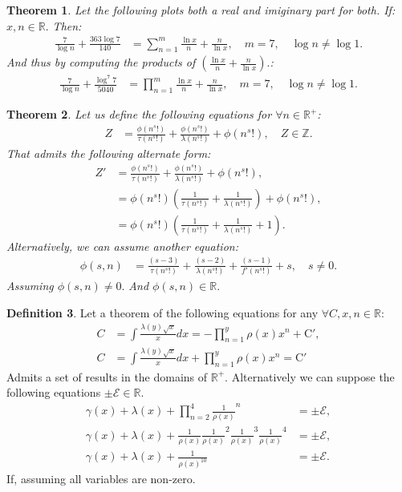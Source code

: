 \documentclass[10pt]{article}
\theoremstyle{plain}
\newtheorem{theorem}{Theorem}[section]
\theoremstyle{definition}
\newtheorem{definition}[theorem]{Definition}
\theoremstyle{remark}
\begin{document}
\begin{theorem}
	Let the following plots both a real and imiginary part for both. If: $x, n \in \mathbb{R}.$ Then:
	\begin{align*}
		\frac{7}{\log n} + \frac{363 \log 7}{140} &= \sum_{n=1}^{m} \frac{\ln x}{n} + \frac{n}{\ln x}, \quad m = 7, \quad \log n \neq \log 1.
	\end{align*}
	And thus by computing the products of $(\frac{\ln x}{n} + \frac{n}{\ln x}).$:
	\begin{align*}
		\frac{7}{\log n} + \frac{\log^{7} 7}{5040} &= \prod_{n=1}^{m} \frac{\ln x}{n} + \frac{n}{\ln x}, \quad m = 7, \quad \log n \neq \log 1.
	\end{align*}
\end{theorem}

\begin{theorem}
	Let us define the following equations for $\forall n \in \mathbb{R}^{+}$:
	\begin{align*}
		Z &= \frac{\phi(n^{s}!)}{\tau(n^{s}!)} + \frac{\phi(n^{s}!)}{\lambda(n^{s}!)} + \phi(n^{s}!), \quad Z \in \mathbb{Z}.
	\end{align*}
	That admits the following alternate form:
	\begin{align*}
		Z' &= \frac{\phi(n^{s}!)}{\tau(n^{s}!)} + \frac{\phi(n^{s}!)}{\lambda(n^{s}!)} + \phi(n^{s}!),\\
		&= \phi(n^{s}!)(\frac{1}{\tau(n^{s}!)} + \frac{1}{\lambda(n^{s}!)}) + \phi(n^{s}!),\\
		&= \phi(n^{s}!)(\frac{1}{\tau(n^{s}!)} + \frac{1}{\lambda(n^{s}!)} + 1).
	\end{align*}
	Alternatively, we can assume another equation:
	\begin{align*}
		\phi(s, n) &= \frac{(s-3)}{\tau(n^{s}!)} + \frac{(s-2)}{\lambda(n^{s}!)} + \frac{(s-1)}{f'(n^{s}!)} + s, \quad s \neq 0.
	\end{align*}
	Assuming $\phi(s, n) \neq 0.$ And $\phi(s, n) \in \mathbb{R}.$
\end{theorem}

\begin{definition}
	Let a theorem of the following equations for any $\forall C, x, n \in \mathbb{R}$:
	\begin{align*}
		C &= \int \frac{\lambda(y) \sqrt{x}}{x} dx = - \prod_{n=1}^{y}\rho(x) x^{n} + \mathrm{C}',\\
		C &= \int \frac{\lambda(y) \sqrt{x}}{x} dx + \prod_{n=1}^{y}\rho(x) x^{n} = \mathrm{C}'
	\end{align*}
	Admits a set of results in the domains of $\mathbb{R}^{+}$. Alternatively we can suppose the following equations $\pm \mathcal{E} \in \mathbb{R}.$
	\begin{align*}
		\gamma(x)+\lambda(x) + \prod_{n=2}^{4}\frac{1}{\rho(x)}^{n} &= \pm \mathrm{\mathcal{E}},\\
		\gamma(x)+\lambda(x) + \frac{1}{\rho(x)} \frac{1}{\rho(x)}^{2} \frac{1}{\rho(x)}^{3} \frac{1}{\rho(x)}^{4} &= \pm \mathrm{\mathcal{E}},\\
		\gamma(x)+\lambda(x) + \frac{1}{\rho(x)^{10}} &= \pm \mathrm{\mathcal{E}}.
	\end{align*}
	If, assuming all variables are non-zero.
\end{definition}
\end{document}
